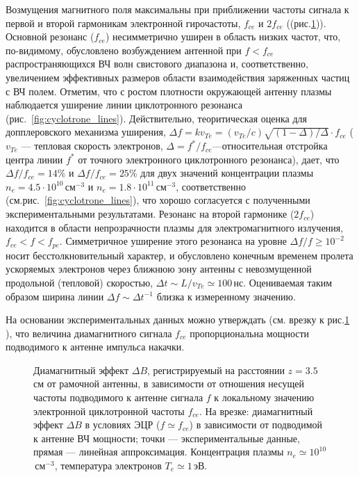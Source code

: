 \documentclass[autoref,10pt]{disser}
\begin{document}
Возмущения магнитного поля максимальны при приближении частоты сигнала к первой   и второй   гармоникам электронной гирочастоты, $f_{ce}$ и $2f_{ce}$ (\mbox{(рис.\ref{fig:cycl_line})}). Основной резонанс ($f_{ce}$) несимметрично уширен в область низких частот, что, по-видимому, обусловлено возбуждением антенной при $f<f_{ce}$ распространяющихся ВЧ волн свистового диапазона и, соответственно, увеличением эффективных размеров области взаимодействия заряженных частиц с ВЧ полем. 
Отметим, что с ростом плотности окружающей антенну плазмы наблюдается уширение линии циклотронного резонанса (\mbox{рис.~\ref{fig:cyclotrone_lines}}). Действительно, теоритическая оценка для допплеровского механизма уширения, $\Delta{}f=kv_{Te}=(v_{Te}/c)\sqrt{(1-\Delta{})/\Delta{}}\cdot{}f_{ce}$ ($v_{Te}$ --- тепловая скорость электронов, $\Delta{}=f^{*}/f_{ce}$---относительная отстройка центра линии $f^{*}$  от точного электронного циклотронного резонанса), дает, что $\Delta{}f/{}f_{ce} = 14\%$ и $\Delta{}f/f_{ce} = 25\%$ для двух значений концентрации плазмы $n_{e}=4.5\cdot{}10^{10}$\,см$^{-3}$ и $n_{e}=1.8\cdot{}10^{11}$\,см$^{-3}$, соответственно (см.\mbox{рис.~\ref{fig:cyclotrone_lines}}), что хорошо согласуется с полученными экспериментальными результатами.
Резонанс на второй гармонике ($2f_{ce}$) находится в области непрозрачности плазмы для электромагнитного излучения, $f_{ce}<f<f_{pe}$. Симметричное уширение этого резонанса на уровне $\Delta f/f\ge 10^{-2}$ носит бесстолкновительный характер, и обусловлено конечным временем пролета ускоряемых электронов через ближнюю зону антенны с невозмущенной продольной (тепловой) скоростью, $\Delta t\sim L/v_{Te}\simeq 100$\,нс. Оцениваемая таким образом ширина линии $\Delta f \sim \Delta t^{-1}$ близка к измеренному значению. 


На основании экспериментальных данных можно утверждать (см. врезку к \mbox{рис.\ref{fig:cycl_line}} ), что величина диамагнитного сигнала $f_{ce}$ пропорциональна мощности подводимого к антенне импульса накачки. 
\begin{figure}[H]
    \centering
    \def\svgwidth{0.6\columnwidth} %
    
    \caption{Диамагнитный эффект $\Delta{}B$, регистрируемый на расстоянии $z=3.5$\,см от рамочной антенны, в зависимости от отношения несущей частоты подводимого к антенне сигнала $f$ к локальному значению электронной циклотронной частоты $f_{ce}$. На врезке: диамагнитный эффект $\Delta{}B$ в условиях ЭЦР ($f\simeq f_{ce}$) в зависимости от подводимой к антенне ВЧ мощности; точки --- экспериментальные данные, прямая --- линейная аппроксимация. Концентрация плазмы $n_{e}\simeq 10^{10}$\,см$^{-3}$, температура электронов $T_e\simeq 1$\,эВ.}
    \label{fig:cycl_line}
\end{figure}
\end{document}
